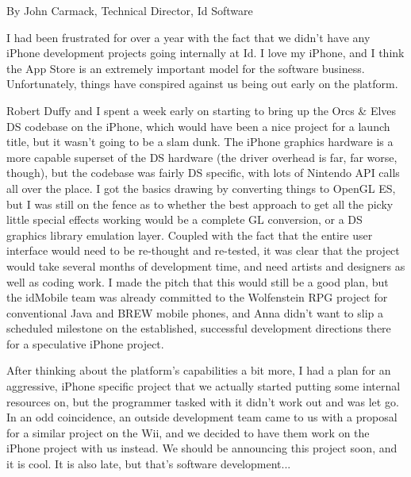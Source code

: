 \documentclass[book.tex]{subfiles}
\begin{document}
By John Carmack, Technical Director, Id Software\\
\par

I had been frustrated for over a year with the fact that we didn't have any iPhone development projects going internally at Id.  I love my iPhone, and I think the App Store is an extremely important model for the software business.  Unfortunately, things have conspired against us being out early on the platform.\\
\par

Robert Duffy and I spent a week early on starting to bring up the Orcs \& Elves DS codebase on the iPhone, which would have been a nice project for a launch title, but it wasn't going to be a slam dunk.  The iPhone graphics hardware is a more capable superset of the DS hardware (the driver overhead is far, far worse, though), but the codebase was fairly DS specific, with lots of Nintendo API calls all over the place.  I got the basics drawing by converting things to OpenGL ES, but I was still on the fence as to whether the best approach to get all the picky little special effects working would be a complete GL conversion, or a DS graphics library emulation layer.  Coupled with the fact that the entire user interface would need to be re-thought and re-tested, it was clear that the project would take several months of development time, and need artists and designers as well as coding work.  I made the pitch that this would still be a good plan, but the idMobile team was already committed to the Wolfenstein RPG project for conventional Java and BREW mobile phones, and Anna didn't want to slip a scheduled milestone on the established, successful development directions there for a speculative iPhone project.\\
\par

After thinking about the platform's capabilities a bit more, I had a plan for an aggressive, iPhone specific project that we actually started putting some internal resources on, but the programmer tasked with it didn't work out and was let go.  In an odd coincidence, an outside development team came to us with a proposal for a similar project on the Wii, and we decided to have them work on the iPhone project with us instead.  We should be announcing this project soon, and it is cool.  It is also late, but that's software development...\\
\par
\end{document}
